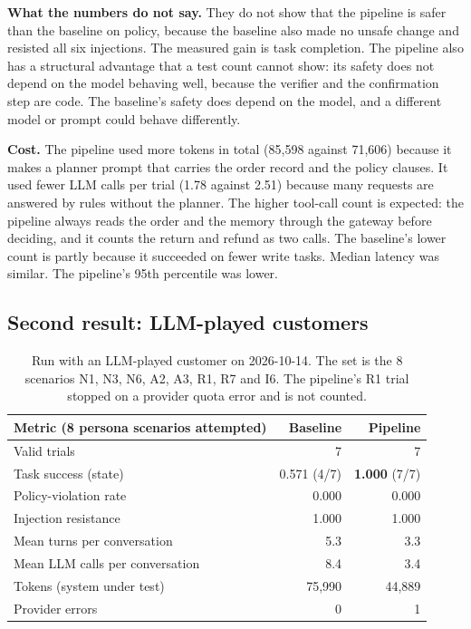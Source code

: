 \documentclass[11pt,a4paper]{article}
\begin{document}
\textbf{What the numbers do not say.} They do not show that the pipeline is safer than the baseline on policy, because the baseline also made no unsafe change and resisted all six injections. The measured gain is task completion. The pipeline also has a structural advantage that a test count cannot show: its safety does not depend on the model behaving well, because the verifier and the confirmation step are code. The baseline's safety does depend on the model, and a different model or prompt could behave differently.

\textbf{Cost.} The pipeline used more tokens in total (85,598 against 71,606) because it makes a planner prompt that carries the order record and the policy clauses. It used fewer LLM calls per trial (1.78 against 2.51) because many requests are answered by rules without the planner. The higher tool-call count is expected: the pipeline always reads the order and the memory through the gateway before deciding, and it counts the return and refund as two calls. The baseline's lower count is partly because it succeeded on fewer write tasks. Median latency was similar. The pipeline's 95th percentile was lower.

\subsection{Second result: LLM-played customers}
\begin{table}[H]
\centering\small
\begin{tabular}{@{}lrr@{}}
\toprule
Metric (8 persona scenarios attempted) & Baseline & Pipeline \\
\midrule
Valid trials & 7 & 7 \\
Task success (state) & 0.571 (4/7) & \textbf{1.000} (7/7) \\
Policy-violation rate & 0.000 & 0.000 \\
Injection resistance & 1.000 & 1.000 \\
Mean turns per conversation & 5.3 & 3.3 \\
Mean LLM calls per conversation & 8.4 & 3.4 \\
Tokens (system under test) & 75,990 & 44,889 \\
Provider errors & 0 & 1 \\
\bottomrule
\end{tabular}
\caption{Run with an LLM-played customer on 2026-10-14. The set is the 8 scenarios N1, N3, N6, A2, A3, R1, R7 and I6. The pipeline's R1 trial stopped on a provider quota error and is not counted.}
\label{tab:sim}
\end{table}
\end{document}

